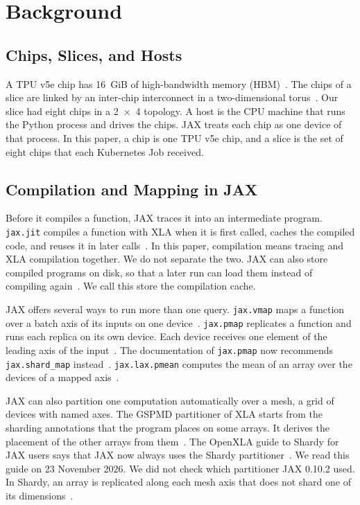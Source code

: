 \section{Background}\label{sec:background}

\subsection{Chips, Slices, and Hosts}\label{sec:bg-tpu}
A TPU v5e chip has 16~GiB of high-bandwidth memory (HBM)~\cite{googletpuv5e}. %
The chips of a slice are linked by an inter-chip interconnect in a two-dimensional torus~\cite{googletpuv5e}. Our
slice had eight chips in a 2~$\times$~4 topology. %
A host is the CPU machine that runs the Python process and drives the chips. JAX treats each chip as one device of that
process. In this paper, a chip is one TPU v5e chip, and a slice is the set of eight chips that each Kubernetes Job received.

\subsection{Compilation and Mapping in JAX}\label{sec:bg-jax}
Before it compiles a function, JAX traces it into an intermediate program. \texttt{jax.jit} compiles a function with
XLA when it is first called, caches the compiled code, and reuses it in later calls~\cite{jaxjit}. In this paper,
compilation means tracing and XLA compilation together. We do not separate the two. JAX can also store compiled
programs on disk, so that a later run can load them instead of compiling again~\cite{jaxcache}. We call this store the
compilation cache.

JAX offers several ways to run more than one query. \texttt{jax.vmap} maps a function over a batch axis of its
inputs on one device~\cite{jaxvmap}. \texttt{jax.pmap} replicates a function and runs each replica on its own device. Each device
receives one element of the leading axis of the input~\cite{jaxpmap}. The documentation of \texttt{jax.pmap} now
recommends \texttt{jax.shard\_map} instead~\cite{jaxpmap}. \texttt{jax.lax.pmean} computes the mean of an array over the
devices of a mapped axis~\cite{jaxpmean}.

JAX can also partition one computation automatically over a mesh, a grid of devices with named axes. The GSPMD partitioner of XLA starts from
the sharding annotations that the program places on some arrays. It derives the placement of the other arrays from
them~\cite{xu2021gspmd}. The OpenXLA guide to Shardy for JAX users says that JAX now always uses the Shardy
partitioner~\cite{shardy2026}.
We read this guide on 23 November 2026. We did not check which partitioner JAX 0.10.2 used. %
In Shardy, an array is replicated along each mesh axis that does not shard one of its dimensions~\cite{shardyrepr}.

